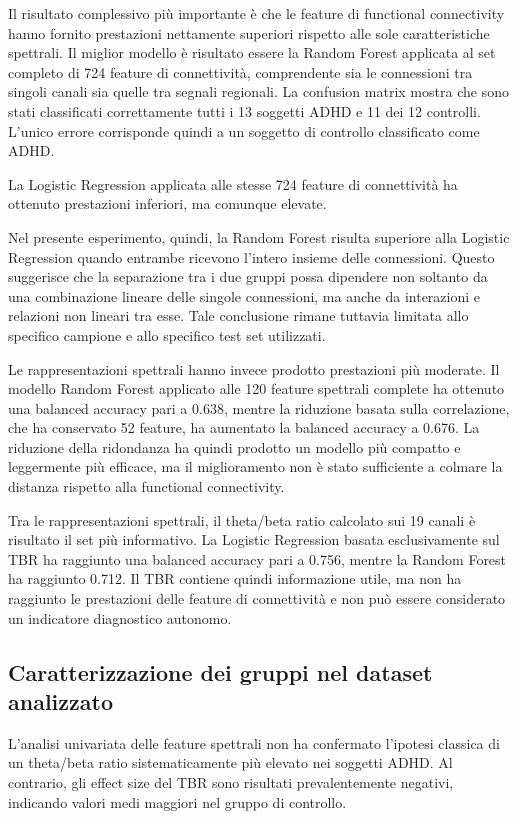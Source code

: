Il risultato complessivo più importante è che le feature di
functional connectivity hanno fornito prestazioni nettamente
superiori rispetto alle sole caratteristiche spettrali. Il miglior
modello è risultato essere la Random Forest applicata al set completo
di 724 feature di connettività, comprendente sia le connessioni tra
singoli canali sia quelle tra segnali regionali. 
La confusion matrix mostra che sono stati classificati correttamente
tutti i 13 soggetti ADHD e 11 dei 12 controlli. L'unico errore
corrisponde quindi a un soggetto di controllo classificato come ADHD.

La Logistic Regression applicata alle stesse 724 feature di
connettività ha ottenuto prestazioni inferiori, ma comunque elevate.

Nel presente esperimento, quindi, la Random Forest risulta superiore
alla Logistic Regression quando entrambe ricevono l'intero insieme
delle connessioni. Questo suggerisce che la separazione tra i due
gruppi possa dipendere non soltanto da una combinazione lineare delle
singole connessioni, ma anche da interazioni e relazioni non lineari
tra esse. Tale conclusione rimane tuttavia limitata allo specifico
campione e allo specifico test set utilizzati.

Le rappresentazioni spettrali hanno invece prodotto prestazioni più
moderate. Il modello Random Forest applicato alle 120 feature
spettrali complete ha ottenuto una balanced accuracy pari a 0.638,
mentre la riduzione basata sulla correlazione, che ha conservato 52
feature, ha aumentato la balanced accuracy a 0.676. La riduzione della
ridondanza ha quindi prodotto un modello più compatto e leggermente
più efficace, ma il miglioramento non è stato sufficiente a colmare
la distanza rispetto alla functional connectivity.

Tra le rappresentazioni spettrali, il theta/beta ratio calcolato sui
19 canali è risultato il set più informativo. La Logistic Regression
basata esclusivamente sul TBR ha raggiunto una balanced accuracy pari
a 0.756, mentre la Random Forest ha raggiunto 0.712. Il TBR contiene
quindi informazione utile, ma non ha raggiunto le prestazioni delle
feature di connettività e non può essere considerato un indicatore
diagnostico autonomo.


\subsection{Caratterizzazione dei gruppi nel dataset analizzato}

L'analisi univariata delle feature spettrali non ha confermato
l'ipotesi classica di un theta/beta ratio sistematicamente più elevato
nei soggetti ADHD. Al contrario, gli effect size del TBR sono risultati
prevalentemente negativi, indicando valori medi maggiori nel gruppo
di controllo.

